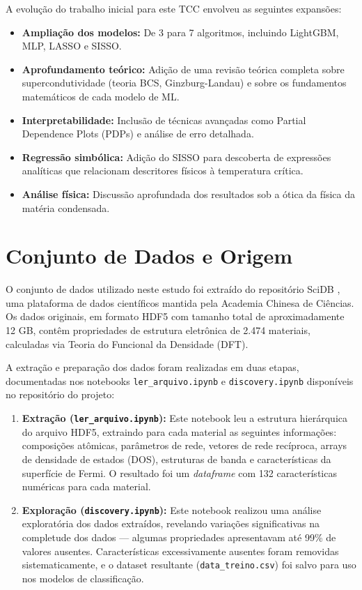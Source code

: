 \documentclass[12pt, a4paper, oneside]{report}
\begin{document}
A evolução do trabalho inicial para este TCC envolveu as seguintes expansões:
\begin{itemize}
    \item \textbf{Ampliação dos modelos:} De 3 para 7 algoritmos, incluindo LightGBM, MLP, LASSO e SISSO.
    \item \textbf{Aprofundamento teórico:} Adição de uma revisão teórica completa sobre supercondutividade (teoria BCS, Ginzburg-Landau) e sobre os fundamentos matemáticos de cada modelo de ML.
    \item \textbf{Interpretabilidade:} Inclusão de técnicas avançadas como Partial Dependence Plots (PDPs) e análise de erro detalhada.
    \item \textbf{Regressão simbólica:} Adição do SISSO para descoberta de expressões analíticas que relacionam descritores físicos à temperatura crítica.
    \item \textbf{Análise física:} Discussão aprofundada dos resultados sob a ótica da física da matéria condensada.
\end{itemize}

\section{Conjunto de Dados e Origem}
\label{sec:dataset}

O conjunto de dados utilizado neste estudo foi extraído do repositório SciDB \cite{scidb2024}, uma plataforma de dados científicos mantida pela Academia Chinesa de Ciências. Os dados originais, em formato HDF5 com tamanho total de aproximadamente 12 GB, contêm propriedades de estrutura eletrônica de 2.474 materiais, calculadas via Teoria do Funcional da Densidade (DFT).

A extração e preparação dos dados foram realizadas em duas etapas, documentadas nos notebooks \texttt{ler\_arquivo.ipynb} e \texttt{discovery.ipynb} disponíveis no repositório do projeto:

\begin{enumerate}
    \item \textbf{Extração (\texttt{ler\_arquivo.ipynb}):} Este notebook leu a estrutura hierárquica do arquivo HDF5, extraindo para cada material as seguintes informações: composições atômicas, parâmetros de rede, vetores de rede recíproca, arrays de densidade de estados (DOS), estruturas de banda e características da superfície de Fermi. O resultado foi um \textit{dataframe} com 132 características numéricas para cada material.
    
    \item \textbf{Exploração (\texttt{discovery.ipynb}):} Este notebook realizou uma análise exploratória dos dados extraídos, revelando variações significativas na completude dos dados --- algumas propriedades apresentavam até 99\% de valores ausentes. Características excessivamente ausentes foram removidas sistematicamente, e o dataset resultante (\texttt{data\_treino.csv}) foi salvo para uso nos modelos de classificação.
\end{enumerate}
\end{document}
